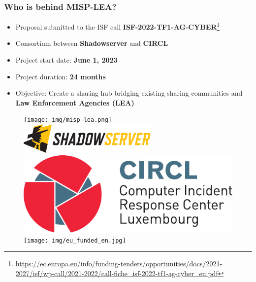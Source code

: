 \begin{frame}
    \frametitle{Who is behind MISP-LEA?}

    \begin{itemize}
            \item Proposal submitted to the ISF call \textbf{ISF-2022-TF1-AG-CYBER}\footnote{\scriptsize{\url{https://ec.europa.eu/info/funding-tenders/opportunities/docs/2021-2027/isf/wp-call/2021-2022/call-fiche_isf-2022-tf1-ag-cyber_en.pdf}}}
        \item Consortium between \textbf{Shadowserver} and \textbf{CIRCL}
        \item Project start date: \textbf{June 1, 2023}
        \item Project duration: \textbf{24 months}
        \item Objective: Create a sharing hub bridging existing sharing communities and \textbf{Law Enforcement Agencies (LEA)}
    \end{itemize}

    \vspace{1em}

    \begin{figure}
        \centering
        \texttt{[image: img/misp-lea.png]} \\[1em]
        \includegraphics[scale=0.4]{img/logo-shadowserver.png}
        \hspace{1em}
        \includegraphics[scale=0.20]{img/logo-circl.pdf}
        \hspace{1em}
        \texttt{[image: img/eu\_funded\_en.jpg]}
    \end{figure}

\end{frame}

